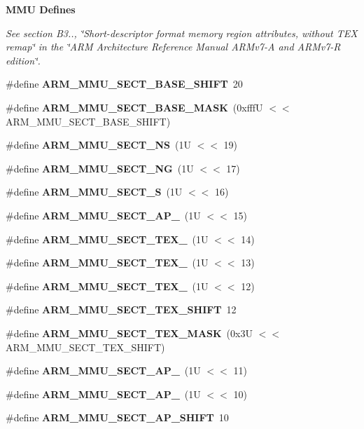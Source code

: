 \begin{Indent}\textbf{ M\+MU Defines}\par
{\em See section B3.., \char`\"{}\+Short-\/descriptor format memory region attributes,
without T\+E\+X remap\char`\"{} in the \char`\"{}\+A\+R\+M Architecture Reference Manual A\+R\+Mv7-\/\+A and
\+A\+R\+Mv7-\/\+R edition\char`\"{}. }\begin{DoxyCompactItemize}
\item 
\#define {\bfseries A\+R\+M\+\_\+\+M\+M\+U\+\_\+\+S\+E\+C\+T\+\_\+\+B\+A\+S\+E\+\_\+\+S\+H\+I\+FT}~20
\item 
\#define {\bfseries A\+R\+M\+\_\+\+M\+M\+U\+\_\+\+S\+E\+C\+T\+\_\+\+B\+A\+S\+E\+\_\+\+M\+A\+SK}~(0xfff\+U $<$$<$ A\+R\+M\+\_\+\+M\+M\+U\+\_\+\+S\+E\+C\+T\+\_\+\+B\+A\+S\+E\+\_\+\+S\+H\+I\+F\+T)
\item 
\#define {\bfseries A\+R\+M\+\_\+\+M\+M\+U\+\_\+\+S\+E\+C\+T\+\_\+\+NS}~(1\+U $<$$<$ 19)
\item 
\#define {\bfseries A\+R\+M\+\_\+\+M\+M\+U\+\_\+\+S\+E\+C\+T\+\_\+\+NG}~(1\+U $<$$<$ 17)
\item 
\#define {\bfseries A\+R\+M\+\_\+\+M\+M\+U\+\_\+\+S\+E\+C\+T\+\_\+S}~(1\+U $<$$<$ 16)
\item 
\#define {\bfseries A\+R\+M\+\_\+\+M\+M\+U\+\_\+\+S\+E\+C\+T\+\_\+\+A\+P\+\_}~(1\+U $<$$<$ 15)
\item 
\#define {\bfseries A\+R\+M\+\_\+\+M\+M\+U\+\_\+\+S\+E\+C\+T\+\_\+\+T\+E\+X\+\_}~(1\+U $<$$<$ 14)
\item 
\#define {\bfseries A\+R\+M\+\_\+\+M\+M\+U\+\_\+\+S\+E\+C\+T\+\_\+\+T\+E\+X\+\_}~(1\+U $<$$<$ 13)
\item 
\#define {\bfseries A\+R\+M\+\_\+\+M\+M\+U\+\_\+\+S\+E\+C\+T\+\_\+\+T\+E\+X\+\_}~(1\+U $<$$<$ 12)
\item 
\#define {\bfseries A\+R\+M\+\_\+\+M\+M\+U\+\_\+\+S\+E\+C\+T\+\_\+\+T\+E\+X\+\_\+\+S\+H\+I\+FT}~12
\item 
\#define {\bfseries A\+R\+M\+\_\+\+M\+M\+U\+\_\+\+S\+E\+C\+T\+\_\+\+T\+E\+X\+\_\+\+M\+A\+SK}~(0x3\+U $<$$<$ A\+R\+M\+\_\+\+M\+M\+U\+\_\+\+S\+E\+C\+T\+\_\+\+T\+E\+X\+\_\+\+S\+H\+I\+F\+T)
\item 
\#define {\bfseries A\+R\+M\+\_\+\+M\+M\+U\+\_\+\+S\+E\+C\+T\+\_\+\+A\+P\+\_}~(1\+U $<$$<$ 11)
\item 
\#define {\bfseries A\+R\+M\+\_\+\+M\+M\+U\+\_\+\+S\+E\+C\+T\+\_\+\+A\+P\+\_}~(1\+U $<$$<$ 10)
\item 
\#define {\bfseries A\+R\+M\+\_\+\+M\+M\+U\+\_\+\+S\+E\+C\+T\+\_\+\+A\+P\+\_\+\+S\+H\+I\+FT}~10
$$
\end{DoxyCompactItemize}
\end{Indent}
